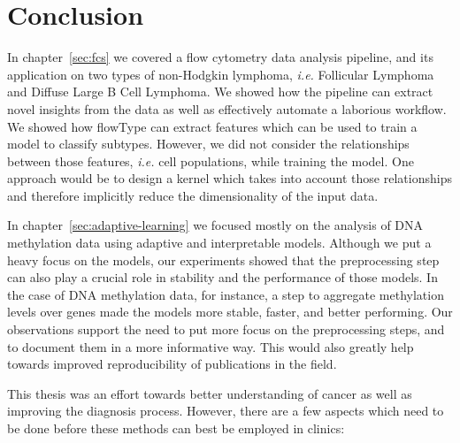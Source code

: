 \chapter{Conclusion}
In chapter~\ref{sec:fcs} we covered a flow cytometry data analysis pipeline,
and its application on two types of non-Hodgkin lymphoma, \emph{i.e.}
Follicular Lymphoma and Diffuse Large B Cell Lymphoma. We showed how the
pipeline can extract novel insights from the data as well as effectively
automate a laborious workflow. We showed how flowType can extract features
which can be used to train a model to classify subtypes. However, we did not
consider the relationships between those features, \emph{i.e.} cell
populations, while training the model. One approach would be to design a kernel
which takes into account those relationships and therefore implicitly reduce
the dimensionality of the input data.

In chapter~\ref{sec:adaptive-learning} we focused mostly on the analysis of DNA
methylation data using adaptive and interpretable models. Although we put a
heavy focus on the models, our experiments showed that the preprocessing step
can also play a crucial role in stability and the performance of those models.
In the case of DNA methylation data, for instance, a step to aggregate
methylation levels over genes made the models more stable, faster, and better
performing. Our observations support the need to put more focus on the
preprocessing steps, and to document them in a more informative way. This would
also greatly help towards improved reproducibility of publications in the
field.

This thesis was an effort towards better understanding of cancer as well as
improving the diagnosis process. However, there are a few aspects which need to
be done before these methods can best be employed in clinics:

